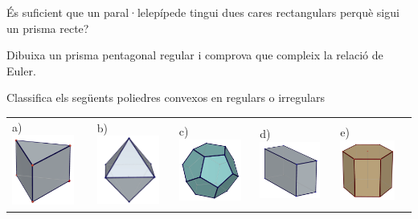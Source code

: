 
\begin{mylist}
\exer  És suficient que un paral·lelepípede tingui dues cares rectangulars perquè sigui un prisma recte?

\exer  Dibuixa un prisma pentagonal regular i comprova que compleix la relació de Euler.

 
\exer \mental  Classifica els següents poliedres convexos en regulars o irregulars


	\begin{longtable}{p{1in}p{1in}p{1in}p{1.0in}p{1in}}
a) \includegraphics[width=0.8in]{img-11/prisma-triangular} & 
b)\includegraphics[width=0.8in]{img-11/octaedre} & 
c)\includegraphics[width=0.8in]{img-11/dodecaedre} & 
d)\includegraphics[width=0.78in]{img-11/ortoedre} & 
e) \includegraphics[width=0.7in]{img-11/prisma-hexagonal} \\ 
\end{longtable}


\end{mylist}
